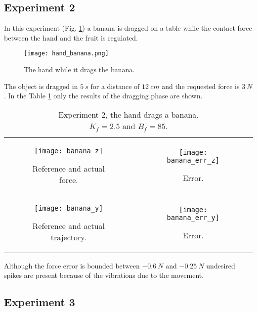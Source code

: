 \subsection{Experiment 2}
In this experiment (Fig. \ref{fig:hand_banana}) a banana is dragged 
on a table while the contact force between the hand and the fruit is regulated.
\begin{figure}[h]
  \centering
  \texttt{[image: hand\_banana.png]}
  \caption{The hand while it drags the banana. \label{fig:hand_banana}}
\end{figure}
The object is dragged in $\SI{5}{s}$ for a distance of $\SI{12}{cm}$ and the requested force is $\SI{3}{N}$.
In the Table \ref{fig:banana} only the results of the dragging phase are shown.
\begin{table}[h]
  \begin{tabular}{cc}
    \begin{subfigure}{0.5\textwidth}
      \centering
      \texttt{[image: banana\_z]}
      \caption{Reference and actual force. \label{fig:banana_z}}
    \end{subfigure}&
    \begin{subfigure}{0.5\textwidth}
      \centering
      \texttt{[image: banana\_err\_z]}
      \caption{Error. \label{fig:banana_error_z}}
    \end{subfigure}\\
    \begin{subfigure}{0.5\textwidth}
      \centering
      \texttt{[image: banana\_y]}
      \caption{Reference and actual trajectory. \label{fig:banana_y}}
    \end{subfigure}&
    \begin{subfigure}{0.5\textwidth}
      \centering
      \texttt{[image: banana\_err\_y]}
      \caption{Error. \label{fig:banana_error_y}}
    \end{subfigure}
  \end{tabular}
  \caption{Experiment 2, the hand drags a banana.\\
  $K_f = 2.5$ and $B_f = 85$.}\label{fig:banana}
\end{table}
Although the force error is bounded between $\SI{-0.6}{N}$ and 
$\SI{-0.25}{N}$ undesired spikes are present because of
the vibrations due to the movement.

\subsection{Experiment 3}
\newpage
